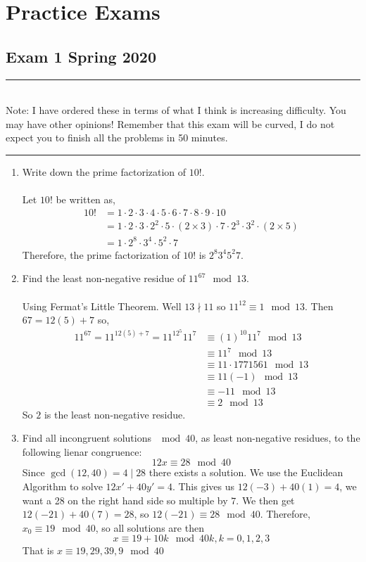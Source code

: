 \documentclass[class=article, crop=false]{standalone}
\begin{document}
\section{Practice Exams}

\subsection{Exam 1 Spring 2020}
\rule{\textwidth}{1pt}\\
Note: I have ordered these in terms of what I think is increasing difficulty.
You may have other opinions! Remember that this exam will be curved, I do not expect
you to finish all the problems in 50 minutes.\\
\rule{\textwidth}{1pt}
\begin{enumerate}[1.]
	\item Write down the prime factorization of $10!$. \\\\
	Let $10!$ be written as,
	\begin{align*}
		10! &= 1\cdot 2\cdot 3\cdot 4\cdot 5\cdot 6\cdot 7\cdot 8\cdot 9\cdot 10 \\
		&= 1\cdot 2\cdot 3\cdot 2^2\cdot 5\cdot (2\times 3)\cdot 7\cdot 2^3\cdot 3^2\cdot (2\times 5) \\
		&= 1\cdot 2^8\cdot 3^4\cdot 5^2\cdot 7
	\end{align*}
	Therefore, the prime factorization of $10!$ is $2^8 3^4 5^2 7$.
	
	\item Find the least non-negative residue of $11^{67} \mod 13$. \\\\
	Using Fermat's Little Theorem. 
	Well $13\nmid 11$ so $11^{12} \equiv 1\mod 13$. Then $67= 12(5) + 7$ so,
	\begin{align*}
		11^{67} = 11^{12(5)+7} = 11^{12^5}11^7 &\equiv (1)^{10} 11^{7} \mod 13 \\
		&\equiv 11^7 \mod 13 \\
		&\equiv 11 \cdot 1771561 \mod 13 \\
		&\equiv 11 (-1) \mod 13 \\
		&\equiv -11 \mod 13 \\
		&\equiv 2 \mod 13
	\end{align*}
	So $2$ is the least non-negative residue.
	
	\item Find all incongruent solutions $\mod 40$, as least non-negative residues,
	to the following lienar congruence: $$12x\equiv 28\mod 40$$
	Since $\gcd(12,40)=4\mid 28$ there exists a solution. We use the Euclidean Algorithm to solve
	$12x' + 40y' = 4$. This gives us $12(-3)+40(1)=4$, we want a 28 on the right hand side so 
	multiple by $7$. We then get $12(-21)+40(7)=28$, so $12(-21)\equiv 28\mod 40$. Therefore,
	$x_0 \equiv 19\mod 40$, so all solutions are then
	$$x\equiv 19 + 10k\mod 40k, k=0,1,2,3$$
	That is $x\equiv 19, 29, 39, 9\mod 40$


\end{enumerate}
\end{document}
